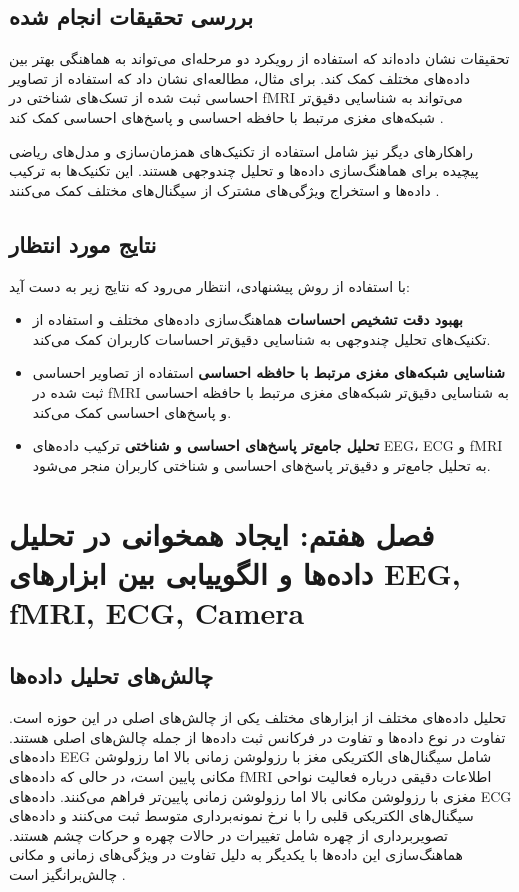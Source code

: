 \documentclass[12pt]{article}
\begin{document}
\subsection{بررسی تحقیقات انجام شده}

تحقیقات نشان داده‌اند که استفاده از رویکرد دو مرحله‌ای می‌تواند به هماهنگی بهتر بین داده‌های مختلف کمک کند. برای مثال، مطالعه‌ای نشان داد که استفاده از تصاویر احساسی ثبت شده از تسک‌های شناختی در fMRI می‌تواند به شناسایی دقیق‌تر شبکه‌های مغزی مرتبط با حافظه احساسی و پاسخ‌های احساسی کمک کند \cite{He2020}.

راهکارهای دیگر نیز شامل استفاده از تکنیک‌های همزمان‌سازی و مدل‌های ریاضی پیچیده برای هماهنگ‌سازی داده‌ها و تحلیل چندوجهی هستند. این تکنیک‌ها به ترکیب داده‌ها و استخراج ویژگی‌های مشترک از سیگنال‌های مختلف کمک می‌کنند \cite{Shu2018}.

\subsection{نتایج مورد انتظار}

با استفاده از روش پیشنهادی، انتظار می‌رود که نتایج زیر به دست آید:
\begin{itemize}

\item \textbf{بهبود دقت تشخیص احساسات}  هماهنگ‌سازی داده‌های مختلف و استفاده از تکنیک‌های تحلیل چندوجهی به شناسایی دقیق‌تر احساسات کاربران کمک می‌کند.
\item \textbf{شناسایی شبکه‌های مغزی مرتبط با حافظه احساسی}  استفاده از تصاویر احساسی ثبت شده در fMRI به شناسایی دقیق‌تر شبکه‌های مغزی مرتبط با حافظه احساسی و پاسخ‌های احساسی کمک می‌کند.
\item \textbf{تحلیل جامع‌تر پاسخ‌های احساسی و شناختی}  ترکیب داده‌های EEG، ECG و fMRI به تحلیل جامع‌تر و دقیق‌تر پاسخ‌های احساسی و شناختی کاربران منجر می‌شود.
\end{itemize}

\section{فصل هفتم: ایجاد همخوانی در تحلیل داده‌ها و الگوییابی بین ابزارهای EEG, fMRI, ECG, Camera}

\subsection{چالش‌های تحلیل داده‌ها}

تحلیل داده‌های مختلف از ابزارهای مختلف یکی از چالش‌های اصلی در این حوزه است. تفاوت در نوع داده‌ها و تفاوت در فرکانس ثبت داده‌ها از جمله چالش‌های اصلی هستند. داده‌های EEG شامل سیگنال‌های الکتریکی مغز با رزولوشن زمانی بالا اما رزولوشن مکانی پایین است، در حالی که داده‌های fMRI اطلاعات دقیقی درباره فعالیت نواحی مغزی با رزولوشن مکانی بالا اما رزولوشن زمانی پایین‌تر فراهم می‌کنند. داده‌های ECG سیگنال‌های الکتریکی قلبی را با نرخ نمونه‌برداری متوسط ثبت می‌کنند و داده‌های تصویربرداری از چهره شامل تغییرات در حالات چهره و حرکات چشم هستند. هماهنگ‌سازی این داده‌ها با یکدیگر به دلیل تفاوت در ویژگی‌های زمانی و مکانی چالش‌برانگیز است \cite{Kunz2019}.
\end{document}
